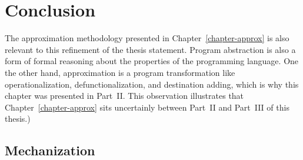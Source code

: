 \chapter{Conclusion}
\label{chapter-conclusion}




The approximation methodology presented in
Chapter~\ref{chapter-approx} is also relevant to this refinement of
the thesis statement. Program abstraction is also a form of formal
reasoning about the properties of the programming language. One the
other hand, approximation is a program transformation like
operationalization, defunctionalization, and destination adding, which
is why this chapter was presented in Part~II. This observation
illustrates that Chapter~\ref{chapter-approx} sits uncertainly between
Part~II and Part~III of this thesis.)

\section{Mechanization}